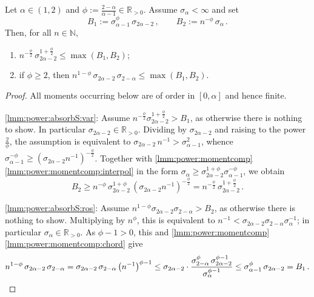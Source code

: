 \documentclass{article}
\newcommand{\N}{\mathbb{N}}
\newcommand{\R}{\mathbb{R}}
\newcommand{\Rpp}{\R_{>0}}
\newcommand{\lb}{\left(} %
\newcommand{\rb}{\right)} %
\newcommand{\br}[1]{\lb #1 \rb} %
\newcommand{\eqcm}{\,,} %
\newcommand{\eqfs}{\,.}
\begin{document}
%
\begin{lemma}\label{lmm:power:absorbS}
    Let $\alpha\in(1,2)$ and $\phi := \frac{2-\alpha}{\alpha-1} \in \Rpp$. Assume $\sigma_\alpha<\infty$ and set
    \begin{equation}
        B_1 := \sigma_{\alpha-1}^{\phi}\, \sigma_{2\alpha-2}
        \eqcm\qquad
        B_2 := n^{-\phi}\, \sigma_\alpha
        \eqfs
    \end{equation}
    Then, for all $n\in\N$,
    \begin{enumerate}[label=(\roman*)]
        \item \label{lmm:power:absorbS:var}
        $n^{-\frac\phi2}\, \sigma_{2\alpha-2}^{1+\frac\phi2} \leq \max(B_1, B_2)$;
        \item \label{lmm:power:absorbS:ros}
        if $\phi\geq2$, then $n^{1-\phi}\, \sigma_{2\alpha-2}\, \sigma_{2-\alpha} \leq \max(B_1, B_2)$.
    \end{enumerate}
\end{lemma}
%
\begin{proof}
    All moments occurring below are of order in $[0,\alpha]$ and hence finite.
    
    \ref{lmm:power:absorbS:var}:
    Assume $n^{-\frac\phi2}\sigma_{2\alpha-2}^{1+\frac\phi2} > B_1$, as otherwise there is nothing to show.
    In particular $\sigma_{2\alpha-2}\in\Rpp$.
    Dividing by $\sigma_{2\alpha-2}$ and raising to the power $\frac2\phi$, the assumption is equivalent to $\sigma_{2\alpha-2}\,n^{-1} > \sigma_{\alpha-1}^{2}$, whence $\sigma_{\alpha-1}^{-\phi} \geq \br{\sigma_{2\alpha-2}n^{-1}}^{-\frac\phi2}$.
    Together with \cref{lmm:power:momentcomp}\,\ref{lmm:power:momentcomp:interpol} in the form $\sigma_\alpha \geq \sigma_{2\alpha-2}^{1+\phi}\sigma_{\alpha-1}^{-\phi}$, we obtain
    \begin{equation}
        B_2
        \geq
        n^{-\phi}\, \sigma_{2\alpha-2}^{1+\phi}\, \br{\sigma_{2\alpha-2}n^{-1}}^{-\frac\phi2}
        =
        n^{-\frac\phi2}\, \sigma_{2\alpha-2}^{1+\frac\phi2}
        \eqfs
    \end{equation}
    
    \ref{lmm:power:absorbS:ros}:
    Assume $n^{1-\phi}\sigma_{2\alpha-2}\sigma_{2-\alpha} > B_2$, as otherwise there is nothing to show.
    Multiplying by $n^{\phi}$, this is equivalent to $n^{-1} < \sigma_{2\alpha-2}\sigma_{2-\alpha}\sigma_\alpha^{-1}$; in particular $\sigma_\alpha\in\Rpp$.
    As $\phi-1>0$, this and \cref{lmm:power:momentcomp}\,\ref{lmm:power:momentcomp:chord} give
    \begin{equation}
        n^{1-\phi}\, \sigma_{2\alpha-2}\, \sigma_{2-\alpha}
        =
        \sigma_{2\alpha-2}\, \sigma_{2-\alpha} \br{n^{-1}}^{\phi-1}
        \leq
        \sigma_{2\alpha-2} \cdot \frac{\sigma_{2-\alpha}^{\phi}\, \sigma_{2\alpha-2}^{\phi-1}}{\sigma_\alpha^{\phi-1}}
        \leq
        \sigma_{\alpha-1}^{\phi}\, \sigma_{2\alpha-2}
        =
        B_1
        \eqfs
        \qedhere
    \end{equation}
\end{proof}
\end{document}
